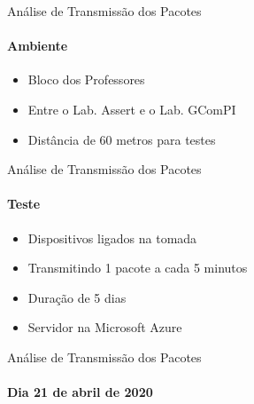 \begin{frame}{Análise de Transmissão dos Pacotes}
  \framesubtitle{Ambiente}
  \begin{itemize}
    \item Bloco dos Professores
    \item Entre o Lab. Assert e o Lab. GComPI
    \item Distância de 60 metros para testes
  \end{itemize}
\end{frame}

\begin{frame}{Análise de Transmissão dos Pacotes}
  \framesubtitle{Teste}
  \begin{itemize}
    \item Dispositivos ligados na tomada
    \item Transmitindo 1 pacote a cada 5 minutos
    \item Duração de 5 dias
    \item Servidor na Microsoft Azure
  \end{itemize}
\end{frame}

\begin{frame}{Análise de Transmissão dos Pacotes}
  \framesubtitle{Dia 21 de abril de 2020}
\end{frame}


